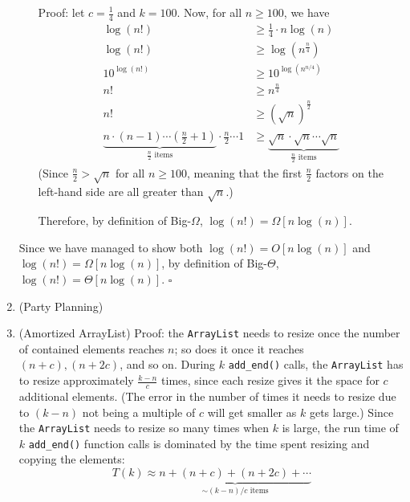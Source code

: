 \documentclass{article}
\begin{document}
\begin{enumerate}
\begin{itemize}
        Proof: let $c = \frac{1}{4}$ and $k = 100$. Now, for all $n \ge 100$, we have
        \begin{displaymath}
          \begin{aligned}
            \log(n!)      & \ge \frac{1}{4} \cdot n\log(n)                                                      \\
            \log(n!)      & \ge \log(n^{\frac{n}{4}})                                                           \\
            10^{\log(n!)} & \ge 10^{\log(n^{n/4})}                                                              \\
            n!            & \ge n^\frac{n}{4}                                                                   \\
            n!            & \ge (\sqrt{n})^{\frac{n}{2}}                                                        \\
            \underbrace{n \cdot (n-1) \cdots (\frac{n}{2}+1)}_{\frac{n}{2}\text{ items}}
            \cdot \frac{n}{2} \cdots 1
                          & \ge \underbrace{\sqrt{n} \cdot \sqrt{n} \cdots \sqrt{n}}_{\frac{n}{2}\text{ items}}
          \end{aligned}
        \end{displaymath}
        (Since $\frac{n}{2} > \sqrt{n}$ for all $n \ge 100$, meaning that the first $\frac{n}{2}$ factors on the left-hand side are all greater than $\sqrt{n}$.)

        Therefore, by definition of Big-$\Omega$, $\log(n!) = \Omega[n\log(n)]$.
    \end{itemize}

    Since we have managed to show both $\log(n!) = O[n\log(n)]$ and $\log(n!) = \Omega[n\log(n)]$, by definition of Big-$\Theta$, $\log(n!) = \Theta[n\log(n)]$. $\square$

    \pagebreak

  \item (Party Planning)


    \pagebreak

  \item (Amortized ArrayList) Proof: the {\tt ArrayList} needs to resize once the number of contained elements reaches $n$; so does it once it reaches $(n + c), (n + 2c)$, and so on. During $k$ {\tt add\_end()} calls, the {\tt ArrayList} has to resize approximately $\frac{k-n}{c}$ times, since each resize gives it the space for $c$ additional elements. (The error in the number of times it needs to resize due to $(k - n)$ not being a multiple of $c$ will get smaller as $k$ gets large.) Since the {\tt ArrayList} needs to resize so many times when $k$ is large, the run time of $k$ {\tt add\_end()} function calls is dominated by the time spent resizing and copying the elements:
    $$T(k) \approx \underbrace{n + (n + c) + (n + 2c) + \cdots}_{\sim (k-n) / c\text{ items}}$$


\end{enumerate}
\end{document}
